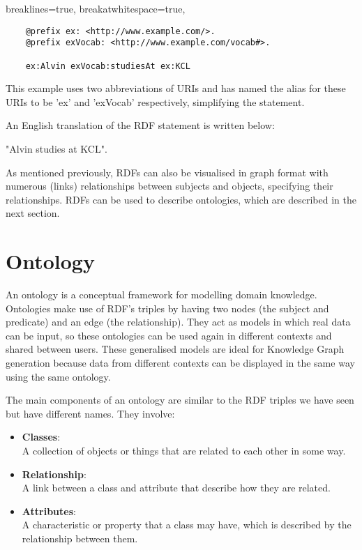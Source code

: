 \lstset
{
    breaklines=true,
    breakatwhitespace=true,
}
\begin{center}
\begin{lstlisting}
    @prefix ex: <http://www.example.com/>. 
    @prefix exVocab: <http://www.example.com/vocab#>. 

    ex:Alvin exVocab:studiesAt ex:KCL
\end{lstlisting}
\end{center} 

This example uses two abbreviations of URIs and has named the alias for these URIs to be 'ex' and 'exVocab' respectively, simplifying the statement. 

An English translation of the RDF statement is written below: 

\begin{center}
    "Alvin studies at KCL". 
\end{center}

As mentioned previously, RDFs can also be visualised in graph format with numerous (links) relationships between subjects and objects, specifying their relationships. RDFs can be used to describe ontologies, which are described in the next section.

\section{Ontology}
\hspace{0.5cm} An ontology is a conceptual framework for modelling domain knowledge. \cite{ontology} Ontologies make use of RDF's triples by having two nodes (the subject and predicate) and an edge (the relationship). They act as models in which real data can be input, so these ontologies can be used again in different contexts and shared between users. These generalised models are ideal for Knowledge Graph generation because data from different contexts can be displayed in the same way using the same ontology. 

The main components of an ontology are similar to the RDF triples we have seen but have different names. They involve:
\begin{itemize}
    \itemsep0em 
\item \textbf{Classes}: \\
A collection of objects or things that are related to each other in some way.

\item \textbf{Relationship}: \\
A link between a class and attribute that describe how they are related. 

\item \textbf{Attributes}:\\ 
A characteristic or property that a class may have, which is described by the relationship between them.

\end{itemize}

